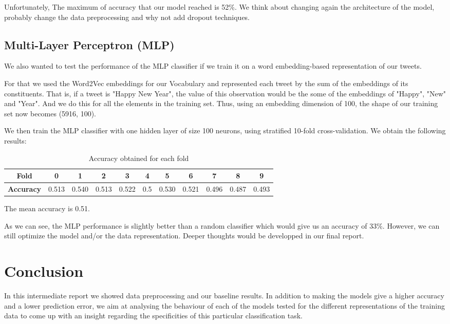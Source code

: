 \documentclass[a4paper,english,12pt]{article}
\begin{document}
Unfortunately, The maximum of accuracy that our model reached is 52\%. We think about changing again the architecture of the model, probably change the data preprocessing and why not add dropout techniques.

\subsection{Multi-Layer Perceptron (MLP)}
We also wanted to test the performance of the MLP classifier if we train it on a word embedding-based representation of our tweets. 

For that we used the Word2Vec embeddings for our Vocabulary and represented each tweet by the sum of the embeddings of its constituents. That is, if a tweet is "Happy New Year", the value of this observation would be the some of the embeddings of "Happy", "New" and "Year". And we do this for all the elements in the training set. Thus, using an embedding dimension of 100, the shape of our training set now becomes (5916, 100).

We then train the MLP classifier with one hidden layer of size 100 neurons, using stratified 10-fold cross-validation. We obtain the following results: 


\begin{table}[H]\centering
	\begin{tabular}{ccccccccccc}
		\toprule
		\textbf{Fold} & 0 & 1 & 2 & 3 & 4 & 5 & 6 & 7 & 8 & 9 \\    \midrule
		\textbf{Accuracy} & 0.513 & 0.540 & 0.513 & 0.522 & 0.5 & 0.530 & 0.521 & 0.496 & 0.487 & 0.493  \\   
		\bottomrule	
	\end{tabular}
	\caption{Accuracy obtained for each fold}
\end{table}

The mean accuracy is 0.51. 

As we can see, the MLP performance is slightly better than a random classifier which would give us an accuracy of 33\%. However, we can still optimize the model and/or the data representation. Deeper thoughts would be developped in our final report. 



\section{Conclusion}
In this intermediate report we showed data preprocessing and our baseline results. In addition to making the models give a higher accuracy and a lower prediction error, we aim at analysing the behaviour of each of the models tested for the different representations of the training data to come up with an insight regarding the specificities of this particular classification task. 
\end{document}
